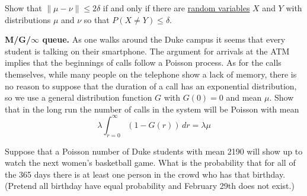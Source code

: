   \begin{exercise}[Durrett 3.6.1]
    Show that $\|\mu - \nu\| \leq 2\delta$ if and only if there are \hyperref[def:random-variable]{random variables} $X$ and $Y$ with distributions $\mu$ and $\nu$ so that $P(X \neq Y) \leq \delta$.
  \end{exercise}
  \begin{solution}

  \end{solution}

  \begin{exercise}[Durrett 3.7.4]
    \textbf{M/G/$\infty$ queue.} As one walks around the Duke campus it seems that every student is talking on their smartphone. The argument for arrivals at the ATM implies that the beginnings of calls follow a Poisson process. As for the calls themselves, while many people on the telephone show a lack of memory, there is no reason to suppose that the duration of a call has an exponential distribution, so we use a general distribution function $G$ with $G(0) = 0$ and mean $\mu$. Show that in the long run the number of calls in the system will be Poisson with mean
    \begin{equation*}
      \lambda \int_{r=0}^\infty (1 - G(r)) \, dr = \lambda\mu \tag{3.7.3}
    \end{equation*}
  \end{exercise}
  \begin{solution}

  \end{solution}

  \begin{exercise}[Durrett 3.7.5]
    Suppose that a Poisson number of Duke students with mean 2190 will show up to watch the next women's basketball game. What is the probability that for all of the 365 days there is at least one person in the crowd who has that birthday. (Pretend all birthday have equal probability and February 29th does not exist.)
  \end{exercise}
  \begin{solution}

  \end{solution}
